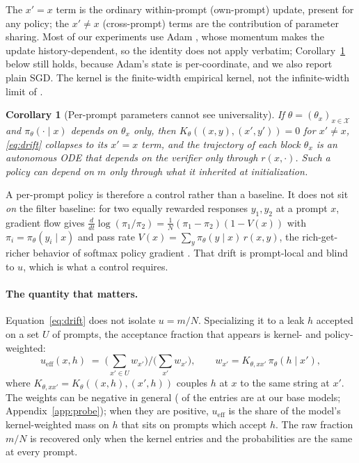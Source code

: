 \documentclass{article}
\newtheorem{corollary}{Corollary}
\theoremstyle{definition}
\newcommand{\Xset}{\mathcal{X}}
\newcommand{\Kk}{K_\theta}
\newcommand{\Kxx}{K_{\theta,xx'}}
\newcommand{\pth}{\pi_\theta}
\newcommand{\ueff}{u_{\mathrm{eff}}}
\begin{document}
The $x'=x$ term is the ordinary within-prompt (own-prompt) update, present for any policy; the $x'\neq x$ (cross-prompt) terms are the contribution of parameter sharing. Most of our experiments use Adam \citep{kingma2015adam}, whose momentum makes the update history-dependent, so the identity does not apply verbatim; Corollary~\ref{cor:tabular} below still holds, because Adam's state is per-coordinate, and we also report plain SGD. The kernel is the finite-width empirical kernel, not the infinite-width limit of \citet{jacot2018ntk}.

\begin{corollary}[Per-prompt parameters cannot see universality]
\label{cor:tabular}
If $\theta = (\theta_x)_{x\in\Xset}$ and $\pth(\cdot\mid x)$ depends on $\theta_x$ only, then $\Kk((x,y),(x',y'))=0$ for $x'\neq x$, \eqref{eq:drift} collapses to its $x'=x$ term, and the trajectory of each block $\theta_x$ is an autonomous ODE that depends on the verifier only through $r(x,\cdot)$. Such a policy can depend on $m$ only through what it inherited at initialization.
\end{corollary}

A per-prompt policy is therefore a control rather than a baseline. It does not sit \emph{on} the filter baseline: for two equally rewarded responses $y_1,y_2$ at a prompt $x$, gradient flow gives $\tfrac{d}{dt}\log(\pi_1/\pi_2) = \tfrac1N(\pi_1-\pi_2)(1-V(x))$ with $\pi_i=\pth(y_i\mid x)$ and pass rate $V(x)=\sum_y\pth(y\mid x)\,r(x,y)$, the rich-get-richer behavior of softmax policy gradient \citep{mei2020global, lochab2026ucpo}. That drift is prompt-local and blind to $u$, which is what a control requires.

\paragraph{The quantity that matters.} Equation~\eqref{eq:drift} does not isolate $u=m/N$. Specializing it to a leak $h$ accepted on a set $U$ of prompts, the acceptance fraction that appears is kernel- and policy-weighted:
\begin{equation}
\ueff(x,h) \;=\; \Big(\textstyle\sum_{x' \in U} w_{x'}\Big) \Big/ \Big(\textstyle\sum_{x'} w_{x'}\Big),
\qquad w_{x'} = \Kxx\,\pth(h\mid x'),
\label{eq:ueff}
\end{equation}
where $\Kxx = \Kk((x,h),(x',h))$ couples $h$ at $x$ to the same string at $x'$. The weights can be negative in general (\ProbeNegKFrac{} of the entries are at our base models; Appendix~\ref{app:probe}); when they are positive, $\ueff$ is the share of the model's kernel-weighted mass on $h$ that sits on prompts which accept $h$. The raw fraction $m/N$ is recovered only when the kernel entries and the probabilities are the same at every prompt.
\end{document}

